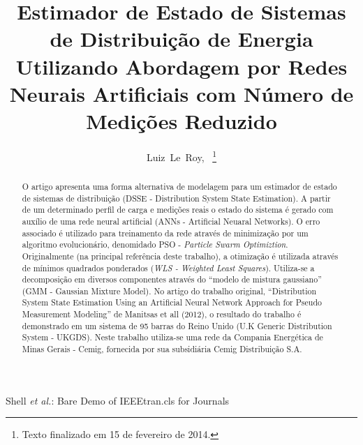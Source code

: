 \documentclass{IEEEtran}
\begin{document}
%
\title{Estimador de Estado de Sistemas de Distribuição de Energia Utilizando Abordagem por Redes Neurais Artificiais com Número de Medições Reduzido}
%
%
%

\author{Luiz~Le~Roy,~
\thanks{Texto finalizado em 15 de fevereiro de 2014.}}

%
{Shell \MakeLowercase{\textit{et al.}}: Bare Demo of IEEEtran.cls for Journals}

\maketitle

\begin{abstract}
O artigo apresenta uma forma alternativa de modelagem para um estimador de estado de sistemas de distribuição (DSSE - Distribution System State Estimation). A partir de um determinado perfil de carga e medições reais o estado do sistema é gerado com auxílio de uma rede neural artificial (ANNs - Artificial Neuaral Networks).
O erro associado é utilizado para treinamento da rede através de minimização por um algoritmo evolucionário, denomidado PSO - \textit{Particle Swarm Optimiztion}. Originalmente (na principal referência deste trabalho), a otimização é utilizada através de mínimos quadrados ponderados (\textit{WLS - Weighted Least Squares}). Utiliza-se a decomposição em diversos componentes através do ``modelo de mistura gaussiano'' (GMM - Gaussian Mixture Model). No artigo do trabalho original, ``Distribution System State Estimation Using an Artificial Neural Network Approach for Pseudo Measurement Modeling'' de Manitsas et all (2012), o resultado do trabalho é demonstrado em um sistema de 95 barras do Reino Unido (U.K Generic Distribution System - UKGDS). Neste trabalho utiliza-se uma rede da Compania Energética de Minas Gerais - Cemig, fornecida por sua subsidiária Cemig Distribuição S.A.
\end{abstract}
\end{document}
